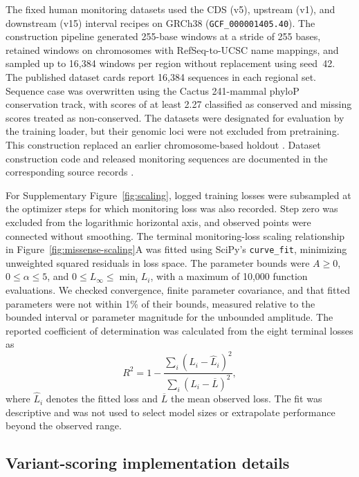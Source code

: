 \documentclass[a4paper,num-refs]{oup-contemporary}
\begin{document}
The fixed human monitoring datasets used the CDS (v5), upstream (v1),
and downstream (v15) interval recipes on GRCh38
(\texttt{GCF\_000001405.40}).
The construction pipeline generated 255-base windows at a stride of
255 bases, retained windows on chromosomes with RefSeq-to-UCSC
name mappings, and sampled up to 16,384 windows per region without
replacement using seed~42.
The published dataset cards report 16,384 sequences in each regional
set.
Sequence case was overwritten using the Cactus 241-mammal phyloP
conservation track, with scores of at least 2.27 classified as
conserved and missing scores treated as non-conserved.
The datasets were designated for evaluation by the training loader,
but their genomic loci were not excluded from pretraining.
This construction replaced an earlier chromosome-based holdout
\citep{marindnamonitoring84}.
Dataset construction code and released monitoring sequences are
documented in the corresponding source records
\citep{marindnamonitoringcode,marindnamonitoringcds,
marindnamonitoringupstream,marindnamonitoringdownstream}.

For Supplementary Figure~\ref{fig:scaling}, logged training losses were subsampled
at the optimizer steps for which monitoring loss was also recorded.
Step zero was excluded from the logarithmic horizontal axis, and
observed points were connected without smoothing.
The terminal monitoring-loss scaling relationship in
Figure~\ref{fig:missense-scaling}A was fitted using
SciPy's \texttt{curve\_fit}, minimizing unweighted squared residuals
in loss space.
The parameter bounds were $A\geq0$, $0\leq\alpha\leq5$, and
$0\leq L_{\infty}\leq\min_i L_i$, with a maximum of 10,000 function
evaluations.
We checked convergence, finite parameter covariance, and that
fitted parameters were not within 1\% of their bounds, measured
relative to the bounded interval or parameter magnitude for the
unbounded amplitude.
The reported coefficient of determination was calculated from
the eight terminal losses as
\[
R^2 =
1-\frac{\sum_i(L_i-\widehat{L}_i)^2}
        {\sum_i(L_i-\overline{L})^2},
\]
where $\widehat{L}_i$ denotes the fitted loss and $\overline{L}$
the mean observed loss.
The fit was descriptive and was not used to select model sizes
or extrapolate performance beyond the observed range.


\subsection{Variant-scoring implementation details}
\label{supp:scoring-details}
\end{document}

